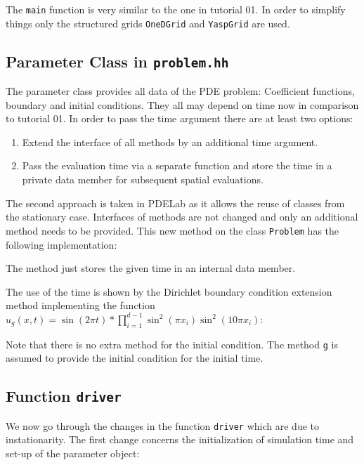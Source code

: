 \documentclass[a4paper,12pt]{article}
\begin{document}
The \lstinline{main} function is very similar to the one in tutorial 01.
In order to simplify things only the structured grids \lstinline{OneDGrid}
and \lstinline{YaspGrid} are used.

\subsection{Parameter Class in \lstinline{problem.hh}}

The parameter class provides all data of the PDE problem: Coefficient functions,
boundary and initial conditions. They all may depend on time now in comparison to tutorial 01.
In order to pass the time argument there are at least two options:
\begin{enumerate}[1)]
\item Extend the interface of all methods by an additional time
argument.
\item Pass the evaluation time via a separate function and store the
time in a private data member for subsequent spatial evaluations.
\end{enumerate}
The second approach is taken in PDELab as it allows the reuse
of classes from the stationary case. Interfaces of methods are not changed
and only an additional method needs to be provided.
This new method on the class \lstinline{Problem} has the following implementation:

The method just stores the given time in
an internal data member.

The use of the time is shown by the Dirichlet boundary condition
extension method implementing the function
$u_g(x,t) = \sin(2\pi t)*\prod_{i=1}^{d-1} \sin^2(\pi x_i)\sin^2(10\pi x_i)$:

Note that there is no extra method for the initial condition.
The method \lstinline{g} is assumed to provide the initial condition
for the initial time.

\subsection{Function \lstinline{driver}}

We now go through the changes in the function \lstinline{driver} which
are due to instationarity. The first change concerns
the initialization of simulation time and set-up of the parameter object:

\end{document}
